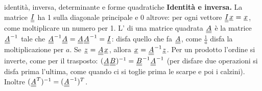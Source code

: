 \begin{richiamo}{identità, inversa, determinante e forme quadratiche}
\textbf{Identità e inversa.} La matrice  $\matr{I}$ ha 1 sulla diagonale principale e 0 altrove: per ogni
vettore $\matr{I}\vett{x} = \vett{x}$, come moltiplicare un numero per 1. L' di una matrice quadrata
$\matr{A}$ è la matrice $\matr{A}^{-1}$ tale che $\matr{A}^{-1}\matr{A} = \matr{A}\matr{A}^{-1} = \matr{I}$: disfa quello
che fa $\matr{A}$, come $\frac{1}{a}$ disfa la moltiplicazione per $a$. Se $\vett{z} = \matr{A}\vett{x}$, allora
$\vett{x} = \matr{A}^{-1}\vett{z}$. Per un prodotto l'ordine si inverte, come per il trasposto:
$(\matr{A}\matr{B})^{-1} = \matr{B}^{-1}\matr{A}^{-1}$ (per disfare due operazioni si disfa prima l'ultima, come quando
ci si toglie prima le scarpe e poi i calzini). Inoltre $(\matr{A}^T)^{-1} = (\matr{A}^{-1})^T$.


\end{richiamo}
